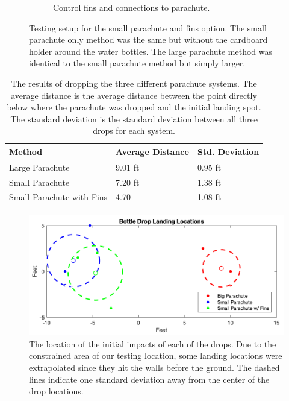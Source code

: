 \documentclass[]{auvsi_doc}
\begin{document}
\begin{figure}[h!]
\begin{subfigure}{0.49\linewidth}
     \caption{Control fins and connections to parachute.}\label{fig:ControlFins}
   \end{subfigure}
\caption{Testing setup for the small parachute and fins option. The small parachute only method was the same but without the cardboard holder around the water bottles. The large parachute method was identical to the small parachute method but simply larger.} 
\label{fig:combined}
\end{figure}

\begin{table}[h]
\caption{The results of dropping the three different parachute systems. The average distance is the average distance between the point directly below where the parachute was dropped and the initial landing spot. The standard deviation is the standard deviation between all three drops for each system.}
\label{table:results}

\begin{tabular}{| l | l | l |}
\hline
Method & Average Distance & Std. Deviation\\
\hline
Large Parachute & 9.01 ft  & 0.95 ft\\
Small Parachute & 7.20 ft  & 1.38 ft\\
Small Parachute with Fins & 4.70  & 1.08 ft\\
\hline

\end{tabular}

\end{table}

\begin{figure}[h]
\includegraphics[width=\columnwidth]{LandingLocations.png}
\caption{The location of the initial impacts of each of the drops. Due to the constrained area of our testing location, some landing locations were extrapolated since they hit the walls before the ground. The dashed lines indicate one standard deviation away from the center of the drop locations.}
\label{fig:locations}
\end{figure}
\end{document}
